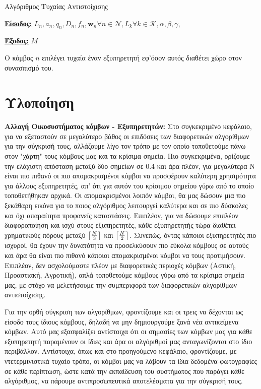 \begin{algorithm}[h]
\caption{Αλγόριθμος Τυχαίας Αντιστοίχισης} \label{algorithm 4}
\begin{algorithmic}[1]
\STATE \textbf{\underline{Είσοδος:}} ${L_n, a_n, q_n, D_n, f_n, \mathbf{w}_n}{\forall n\in \mathcal{N}}, {L_k}{\forall k \in \mathcal{K}}, \alpha,\beta,\gamma$,

\STATE \textbf{\underline{Έξοδος:}}  $M$

\STATE Ο κόμβος $n$ επιλέγει τυχαία έναν εξυπηρετητή εφ'όσον αυτός διαθέτει χώρο στον συνασπισμό του.
\ENDFOR
\end{algorithmic}
\end{algorithm}
\vspace{-7pt}

\section{Υλοποίηση}

\textbf{Αλλαγή Οικοσυστήματος κόμβων - Εξυπηρετητών:} Στο συγκεκριμένο κεφάλαιο, για να εξεταστούν σε μεγαλύτερο βάθος οι επιδόσεις των διαφορετικών αλγορίθμων για την σύγκρισή τους, αλλάζουμε λίγο τον τρόπο με τον οποίο τοποθετούμε πάνω στον "χάρτη" τους κόμβους μας και τα κρίσιμα σημεία. Πιο συγκεκριμένα, ορίζουμε την ελάχιστη απόσταση μεταξύ δύο σημείων σε 0.4 και άρα πλέον, για μεγαλύτερα Ν είναι πιο πιθανό οι πιο απομακρισμένοι κόμβοι να προσφέρουν καλύτερη χρησιμότητα για άλλους εξυπηρετητές, απ' ότι για αυτόν του κρίσιμου σημείου γύρω από το οποίο τοποθετήθηκαν αρχικά. Οι απομακρισμένοι λοιπόν κόμβοι, θα μας δώσουν μια πιο ξεκάθαρη εικόνα για το ποιος αλγόριθμος λειτουργεί καλύτερα και σε πιο δύσκολες και όχι απαραίτητα προφανείς καταστάσεις. Επιπλέον, για να δώσουμε επιπλέον διαφοροποίηση και ισχύ στους εξυπηρετητές, κάθε εξυπηρετητής τώρα διαθέτει χρηματικούς πόρους μεταξύ $\ceil*{\frac{N}{3}}$ και $\ceil*{\frac{N}{2}}$. Συνεπώς, όντας κάποιοι εξυπηρετητές πιο ισχυροί, θα έχουν την δυνατότητα να προσελκύσουν πιο εύκολα κόμβους σε αυτούς και άρα θα είναι πιο πιθανό κάποιοι απομακρισμένοι κόμβοι να τους προτιμήσουν. Επιπλέον, δεν ασχολούμαστε πλέον με διαφορετικές περιοχές κόμβων (Αστική, Προαστιακή, Αγροτική), απλά τοποθετούμε κόμβους γύρω από τα κρίσιμα σημεία μας, με στόχο να μελετήσουμε την συμπεριφορά των διαφορετικών αλγορίθμων αντιστοίχισης.

Για την ορθή σύγκριση των αλγορίθμων, φροντίζουμε και οι τρεις να δέχονται ως είσοδο τους ίδιους κόμβους, δηλαδή να μην δημιουργούμε ξανά νέα αντικείμενα κόμβων. Αυτό μας εξασφαλίζει αντίστοιχα ότι οι σημασίες των κόμβων μας για κάθε εξυπηρετητή παραμένουν οι ίδιες και άρα οι αλγόριθμοί μας ανταγωνίζονται στο ίδιο περιβάλλον. Αντίστοιχα, όπως και στο προηγούμενο κεφάλαιο, φροντίζουμε, με ντετερμινιστικά τυχαίο τρόπο, οι κόμβοι μας να λάβουν τα ίδια δεδομένα-φωτογραφίες σε κάθε περίπτωση, ώστε κατά την εκπαίδευση του συστήματος που παράγει κάθε αλγόριθμος, να πάρουμε αντιπροσωπευτικά αποτελέσματα για την σύγκρισή τους. 

